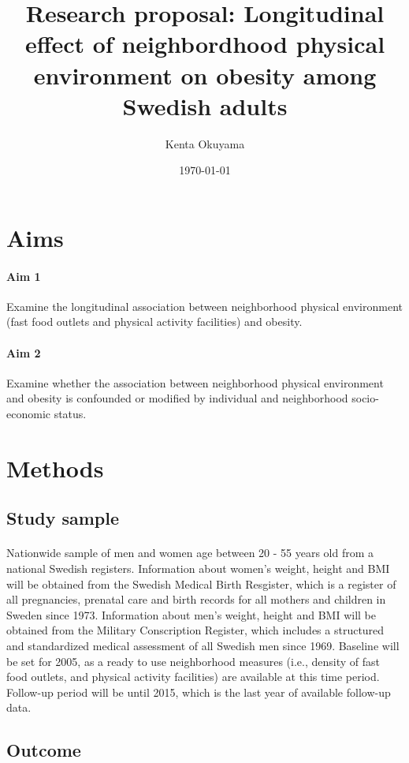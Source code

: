 \documentclass[12]{article}
\title{Research proposal: Longitudinal effect of neighbordhood physical environment on obesity among Swedish adults}
\date{\today}
\author{Kenta Okuyama}
\begin{document}
\maketitle
{}
  
\section{Aims} %
\paragraph{Aim 1}
Examine the longitudinal association between neighborhood physical environment (fast food outlets and physical activity facilities) and obesity.
\paragraph{Aim 2}
Examine whether the association between neighborhood physical environment and obesity is confounded or modified by individual and neighborhood socio-economic status.

\section{Methods}
\subsection{Study sample}
\paragraph{} Nationwide sample of men and women age between 20 - 55 years old from a national Swedish registers. Information about women's weight, height and BMI will be obtained from the Swedish Medical Birth Resgister, which is a register of all pregnancies, prenatal care and birth records for all mothers and children in Sweden since 1973. Information about men's weight, height and BMI will be obtained from the Military Conscription Register, which includes a structured and standardized medical assessment of all Swedish men since 1969. Baseline will be set for 2005, as a ready to use neighborhood measures (i.e., density of fast food outlets, and physical activity facilities) are available at this time period. Follow-up period will be until 2015, which is the last year of available follow-up data.
\subsection{Outcome}
\end{document}
